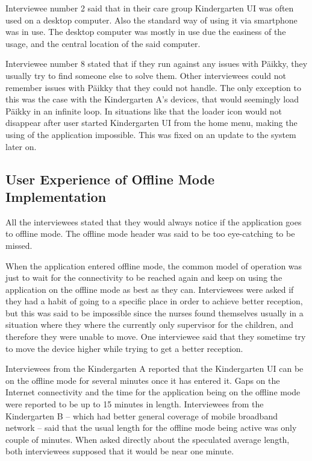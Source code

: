 Interviewee number 2 said that in their care group Kindergarten UI was often used on a desktop computer. Also the standard way of using it via smartphone was in use. The desktop computer was mostly in use due the easiness of the usage, and the central location of the said computer. 

Interviewee number 8 stated that if they run against any issues with Päikky, they usually try to find someone else to solve them. Other interviewees could not remember issues with Päikky that they could not handle. The only exception to this was the case with the Kindergarten A's devices, that would seemingly load Päikky in an infinite loop. In situations like that the loader icon would not disappear after user started Kindergarten UI from the home menu, making the using of the application impossible. This was fixed on an update to the system later on.


\subsection{User Experience of Offline Mode Implementation}

All the interviewees stated that they would always notice if the application goes to offline mode. The offline mode header was said to be too eye-catching to be missed.

When the application entered offline mode, the common model of operation was just to wait for the connectivity to be reached again and keep on using the application on the offline mode as best as they can. Interviewees were asked if they had a habit of going to a specific place in order to achieve better reception, but this was said to be impossible since the nurses found themselves usually in a situation where they where the currently only supervisor for the children, and therefore they were unable to move. One interviewee said that they sometime try to move the device higher while trying to get a better reception.

Interviewees from the Kindergarten A reported that the Kindergarten UI can be on the offline mode for several minutes once it has entered it. Gaps on the Internet connectivity and the time for the application being on the offline mode were reported to be up to 15 minutes in length. Interviewees from the Kindergarten B -- which had better general coverage of mobile broadband network -- said that the usual length for the offline mode being active was only couple of minutes. When asked directly about the speculated average length, both interviewees supposed that it would be near one minute.

